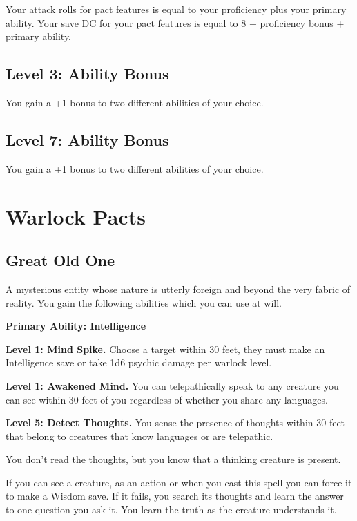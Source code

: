 \documentclass[12pt,letterpaper,twocolumn,openany,nodeprecatedcode,bg=none]{dndbook}
\let\oldsubsection\subsection
\renewcommand{\subsection}[1]{%
  \needspace{5\baselineskip}%
  \oldsubsection{#1}%
}
\begin{document}
Your attack rolls for pact features is equal to your proficiency plus
your primary ability. Your save DC for your pact features is equal to 8
+ proficiency bonus + primary ability.

\subsection{Level 3: Ability Bonus}\label{level-3-ability-bonus}

You gain a +1 bonus to two different abilities of your choice.

\subsection{Level 7: Ability Bonus}\label{level-7-ability-bonus}

You gain a +1 bonus to two different abilities of your choice.

\clearpage

\section{Warlock Pacts}\label{warlock-pacts}

\subsection{Great Old One}\label{great-old-one}

A mysterious entity whose nature is utterly foreign and beyond the very
fabric of reality. You gain the following abilities which you can use at
will.

\textbf{Primary Ability: Intelligence}

\textbf{Level 1: Mind Spike.} Choose a target within 30 feet, they must
make an Intelligence save or take 1d6 psychic damage per warlock level.

\textbf{Level 1: Awakened Mind.} You can telepathically speak to any
creature you can see within 30 feet of you regardless of whether you
share any languages.

\textbf{Level 5: Detect Thoughts.} You sense the presence of thoughts
within 30 feet that belong to creatures that know languages or are
telepathic.

You don't read the thoughts, but you know that a thinking creature is
present.

If you can see a creature, as an action or when you cast this spell you
can force it to make a Wisdom save. If it fails, you search its thoughts
and learn the answer to one question you ask it. You learn the truth as
the creature understands it.
\end{document}
